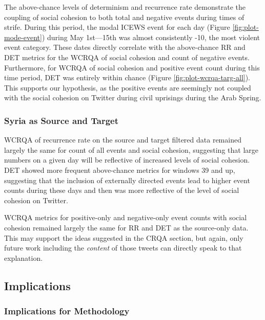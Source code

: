 \documentclass[english,man]{apa6}
\begin{document}
The above-chance levels of determinism and recurrence rate demonstrate
the coupling of social cohesion to both total and negative events during
times of strife. During this period,
the modal ICEWS event for each day (Figure \ref{fig:plot-mode-event})
during May 1st---15th was almost consistently -10, the most violent
event category. These dates directly correlate with the above-chance RR and DET
metrics for the WCRQA of social cohesion and count of negative events.
Furthermore, for WCRQA of social cohesion and positive event count during
this time period, DET was entirely within chance (Figure
\ref{fig:plot-wcrqa-targ-all}). This supports our hypothesis, as the
positive events are seemingly not coupled with the social cohesion on Twitter
during civil uprisings during the Arab Spring.

\hypertarget{syria-as-source-and-target-3}{%
\subsubsection{Syria as Source and Target}\label{syria-as-source-and-target-3}}

WCRQA of recurrence rate on the source and target filtered data remained
largely the same for count of all events and social cohesion, suggesting
that large numbers on a given day will be reflective of increased levels
of social cohesion. DET showed more frequent above-chance metrics
for windows 39 and up, suggesting that the inclusion of externally
directed events lead to higher event counts during these days and then
was more reflective of the level of social cohesion on Twitter.

WCRQA metrics for positive-only and negative-only event counts with
social cohesion remained largely the same for
RR and DET as the source-only data. This may support the ideas suggested
in the CRQA section, but again, only future work including the \emph{content}
of those tweets can directly speak to that explanation.

\hypertarget{implications}{%
\subsection{Implications}\label{implications}}

\hypertarget{implications-for-methodology}{%
\subsubsection{Implications for Methodology}\label{implications-for-methodology}}
\end{document}
